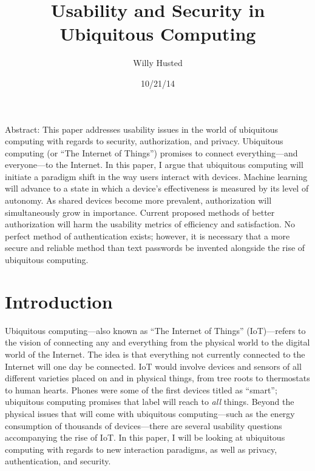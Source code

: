 \documentclass[11pt, oneside]{article}   	%
\title{Usability and Security in Ubiquitous Computing}
\author{Willy Husted}
\date{10/21/14}							%
\begin{document}
\maketitle
Abstract: This paper addresses usability issues in the world of ubiquitous computing with regards to security, authorization, and privacy. Ubiquitous computing (or ``The Internet of Things'') promises to connect everything---and everyone---to the Internet. In this paper, I argue that ubiquitous computing will initiate a paradigm shift in the way users interact with devices. Machine learning will advance to a state in which a device's effectiveness is measured by its level of autonomy. As shared devices become more prevalent, authorization will simultaneously grow in importance. Current proposed methods of better authorization will harm the usability metrics of efficiency and satisfaction. No perfect method of authentication exists; however, it is necessary that a more secure and reliable method than text passwords be invented alongside the rise of ubiquitous computing. 

\section{Introduction}
Ubiquitous computing---also known as ``The Internet of Things'' (IoT)---refers to the vision of connecting any and everything from the physical world to the digital world of the Internet. The idea is that everything not currently connected to the Internet will one day be connected. IoT would involve devices and sensors of all different varieties placed on and in physical things, from tree roots to thermostats to human hearts. Phones were some of the first devices titled as ``smart''; ubiquitous computing promises that label will reach to \textit{all} things. Beyond the physical issues that will come with ubiquitous computing---such as the energy consumption of thousands of devices---there are several usability questions accompanying the rise of IoT. In this paper, I will be looking at ubiquitous computing with regards to new interaction paradigms, as well as privacy, authentication, and security.
\end{document}
